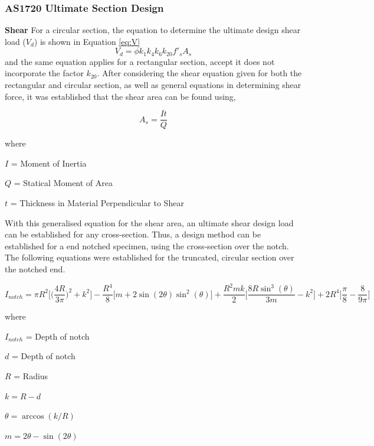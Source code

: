 \documentclass[11pt,a4paper]{article}
\numberwithin{equation}{subsection}
\begin{document}
\subsubsection{AS1720 Ultimate Section Design}
\textbf{Shear}
For a circular section, the equation to determine the ultimate design shear load ($V_{d}$) is shown in Equation \ref{eq:V}
	\begin{equation}
	V_{d} = \phi k_{1} k_{4} k_{6} k_{20} f'_{s} A_{s}
	\label{eq:V}
	\end{equation}
\noindent
and the same equation applies for a rectangular section, accept it does not incorporate the factor $k_{20}$. After considering the shear equation given for both the rectangular and circular section, as well as general equations in determining shear force, it was established that the shear area can be found using, 
	
	\begin{equation}
	A_{s} = \frac{It}{Q}
	\label{eq:As}
	\end{equation}

where \par
$ I $ = Moment of Inertia\par
$ Q $ = Statical Moment of Area \par
$ t $ = Thickness in Material Perpendicular to Shear \par

\vspace*{\baselineskip}

\noindent
With this generalised equation for the shear area, an ultimate shear design load can be established for any cross-section. Thus, a design method can be established for a end notched specimen, using the cross-section over the notch. The following equations were established for the truncated, circular section over the notched end.

	\begin{equation}
	I_{notch} = \pi R^{2}\bigg[\bigg(\frac{4R}{3\pi}\bigg)^{2}+k^{2}\bigg]- \frac{R^{4}}{8}\bigg[m+2\sin(2\theta)\sin^{2}(\theta)\bigg]+\frac{R^{2}mk}{2}\bigg[\frac{8R\sin^{3}(\theta)}{3m}-k^{2}\bigg]+2R^{4}\bigg[\frac{\pi}{8}-\frac{8}{9\pi}\bigg]
	\label{eq:Itot}
	\end{equation} 
	
	where\par
	$ I_{notch} $ = Depth of notch \par
	$ d $ = Depth of notch \par
	$ R $ = Radius \par
	$ k  = R - d$ \par
	$ \theta = \arccos(k/R)$ \par
	$ m = 2\theta-\sin(2\theta)$ \par
\end{document}
